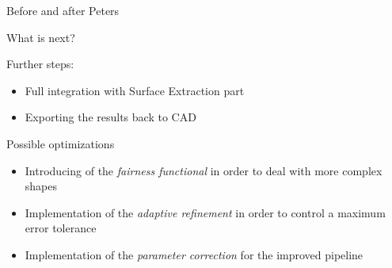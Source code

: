 \begin{frame}{Before and after Peters}
%

\end{frame}
\begin{frame}{What is next?}
\begin{block}{Further steps:}
\begin{itemize}
\item Full integration with Surface Extraction part
\item Exporting the results back to CAD  
\end{itemize}
\end{block}
\begin{block}{Possible optimizations}
\begin{itemize}
\item Introducing of the \textit{fairness functional} in order to deal with more complex shapes
\item Implementation of the \textit{adaptive refinement} in order to control a maximum error tolerance
\item Implementation of the \textit{parameter correction} for the improved pipeline
\end{itemize}
\end{block}
\end{frame}